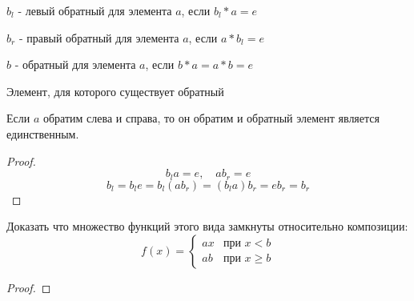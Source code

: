 \documentclass[../main/document.tex]{subfiles}
\begin{document}
\begin{dfn}
$b_l$ - левый обратный для элемента $a$, если $b_l*a=e$
\end{dfn}
\begin{dfn}
$b_r$ - правый обратный для элемента $a$, если $a*b_l=e$
\end{dfn}
\begin{dfn}
$b$ - обратный для элемента $a$, если $b*a=a*b=e$
\end{dfn}
\begin{dfn}
Элемент, для которого существует обратный
\end{dfn}
\begin{thm}
Если $a$ обратим слева и справа, то он обратим и обратный элемент является единственным.
\begin{proof}
$$b_la=e,\quad ab_r=e$$
$$b_l=b_le=b_l(ab_r)=(b_la)b_r=eb_r=b_r$$

\end{proof}
\end{thm}
\begin{exm}
Доказать что множество функций этого вида замкнуты относительно композиции:
$$f(x)=
\begin{cases}
ax & \text{при } x<b\\
ab & \text{при } x\geq b
\end{cases}
$$
\begin{proof}

\end{proof}

\end{exm}
\end{document}
